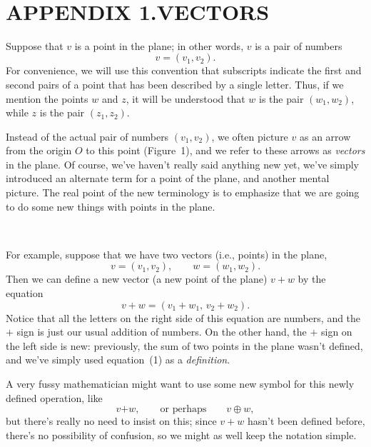 \begin{center}
\\[0.6em]
\end{center}

\section*{APPENDIX 1.\quad VECTORS}

Suppose that $v$ is a point in the plane; in other words, $v$ is a pair of
numbers
\[
v=(v_1,v_2).
\]
For convenience, we will use this convention that subscripts indicate the first
and second pairs of a point that has been described by a single letter. Thus,
if we mention the points $w$ and $z$, it will be understood that $w$ is the pair
$(w_1,w_2)$, while $z$ is the pair $(z_1,z_2)$.

Instead of the actual pair of numbers $(v_1,v_2)$, we often picture $v$ as an
arrow from the origin $O$ to this point (Figure~1), and we refer to these
arrows as \emph{vectors} in the plane. Of course, we've haven't really said
anything new yet, we've simply introduced an alternate term for a point of the
plane, and another mental picture. The real point of the new terminology is to
emphasize that we are going to do some new things with points in the plane.

\begin{center}
\\[0.6em]
\end{center}

For example, suppose that we have two vectors (i.e., points) in the plane,
\[
v=(v_1,v_2),\qquad w=(w_1,w_2).
\]
Then we can define a new vector (a new point of the plane) $v+w$ by the
equation
\begin{equation}
v+w=(v_1+w_1,\,v_2+w_2).\tag{1}
\end{equation}
Notice that all the letters on the right side of this equation are numbers, and
the $+$ sign is just our usual addition of numbers. On the other hand, the $+$
sign on the left side is new: previously, the sum of two points in the plane
wasn't defined, and we've simply used equation~(1) as a \emph{definition}.

A very fussy mathematician might want to use some new symbol for this newly
defined operation, like
\[
v\mathbin{\boldsymbol{+}}w, \qquad\text{or perhaps}\qquad v\oplus w,
\]
but there's really no need to insist on this; since $v+w$ hasn't been defined
before, there's no possibility of confusion, so we might as well keep the
notation simple.

